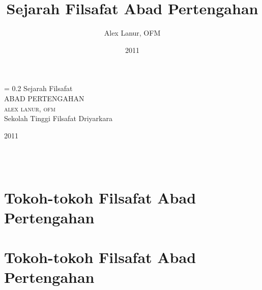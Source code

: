 \documentclass[11pt,twoside,a5paper,openany]{memoir}
\title{Sejarah Filsafat Abad Pertengahan}
\author{Alex Lanur, OFM}
\date{2011}
\newcommand*\parttitle{}
\let\origpart\part
\renewcommand*{\part}[2][]{%
   \ifx\\#1\\%
      \origpart{#2}%
      \renewcommand*\parttitle{#2}%
   \else
      \origpart[#1]{#2}%
      \renewcommand*\parttitle{#1}%
   \fi
}
\newlength{\drop}
\newcommand*{\titleRF}{\begingroup
\drop = 0.2\textheight
\centering
\vspace*{0\drop}
\vfill
{\Huge Sejarah Filsafat}\\[\baselineskip]
{\Huge ABAD PERTENGAHAN}\\[\baselineskip]
\vfill
{\Large\scshape alex lanur, ofm}\\[0.5\drop]
\vfill
{\large Sekolah Tinggi Filsafat Driyarkara}\par
{\large 2011}\par
\vfill\endgroup}
\begin{document}
\titleRF
\thispagestyle{empty}
\sloppybottom
\setcounter{tocdepth}{1}
\frontmatter
\tableofcontents

\mainmatter
\part{Tokoh-tokoh Filsafat Abad Pertengahan}

\end{document}
